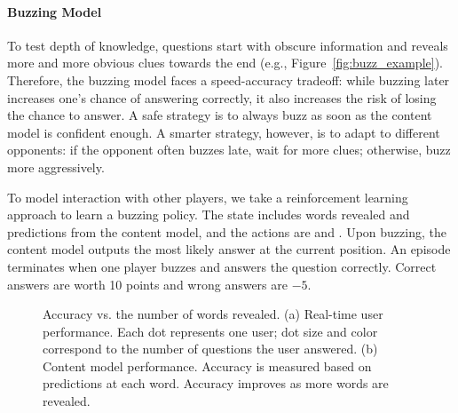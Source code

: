 \paragraph{Buzzing Model}

To test depth of knowledge, questions start
with obscure information and reveals more and more obvious clues towards the
end (e.g., Figure~\ref{fig:buzz_example}).  Therefore, the buzzing model faces a speed-accuracy tradeoff: while
buzzing later increases one's chance of answering correctly, it also increases
the risk of losing the chance to answer.  A safe strategy is to always buzz as
soon as the content model is confident enough.  A smarter strategy, however, is
to adapt to different opponents: if the opponent often buzzes late, wait for more clues; otherwise, buzz more aggressively.

To model interaction with other players, we take a reinforcement learning
approach to learn a buzzing policy.  The state includes words revealed and
predictions from the content model, and the actions are  and
.  Upon buzzing, the content model outputs the most likely answer at
the current position.  An episode terminates when one player buzzes and answers
the question correctly.  Correct answers are worth 10 points and wrong answers
are $-5$.

\begin{figure}[t]
\centering
{}
\hspace{-1em}
\caption{Accuracy vs. the number of words revealed. (a) Real-time user
  performance. Each dot represents one user; dot size and color correspond to
  the number of questions the user answered. (b) Content model
  performance. Accuracy is measured based on predictions at each word.
  Accuracy improves as more words are revealed.}
\end{figure}

